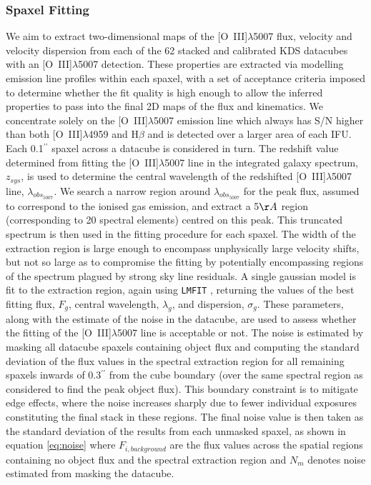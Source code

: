\documentclass[fleqn,usenatbib]{mn2e}
\begin{document}
\subsubsection{Spaxel Fitting}\label{subsubsection:spaxel_fitting}
We aim to extract two-dimensional maps of the [O~{\sc III}]$\lambda$5007 flux, velocity and velocity dispersion from each of the 62 stacked and calibrated KDS datacubes with an [O~{\sc III}]$\lambda$5007 detection.
These properties are extracted via modelling emission line profiles within each spaxel, with a set of acceptance criteria imposed to determine whether the fit quality is high enough to allow the inferred properties to pass into the final 2D maps of the flux and kinematics.
We concentrate solely on the [O~{\sc III}]$\lambda$5007 emission line which always has S/N higher than both [O~{\sc III}]$\lambda$4959 and H$\beta$ and is detected over a larger area of each IFU. \\

Each 0.1$^{\prime\prime}$ spaxel across a datacube is considered in turn.
The redshift value determined from fitting the [O~{\sc III}]$\lambda$5007 line in the integrated galaxy spectrum, $z_{sys}$, is used to determine the central wavelength of the redshifted [O~{\sc III}]$\lambda$5007 line, $\lambda_{obs_{5007}}$. 
We search a narrow region around $\lambda_{obs_{5007}}$ for the peak flux, assumed to correspond to the ionised gas emission, and extract a 5$\AA$ region (corresponding to 20 spectral elements) centred on this peak.
This truncated spectrum is then used in the fitting procedure for each spaxel.
The width of the extraction region is large enough to encompass unphysically large velocity shifts, but not so large as to compromise the fitting by potentially encompassing regions of the spectrum plagued by strong sky line residuals.
A single gaussian model is fit to the extraction region, again using {\tt LMFIT} \citep{Newville2014}, returning the values of the best fitting flux, $F_{g}$, central wavelength, $\lambda_{g}$, and dispersion, $\sigma_{g}$.
These parameters, along with the estimate of the noise in the datacube, are used to assess whether the fitting of the [O~{\sc III}]$\lambda$5007 line is acceptable or not. 
The noise is estimated by masking all datacube spaxels containing object flux and computing the standard deviation of the flux values in the spectral extraction region for all remaining spaxels inwards of 0.3$^{\prime\prime}$ from the cube boundary (over the same spectral region as considered to find the peak object flux).
This boundary constraint is to mitigate edge effects, where the noise increases sharply due to fewer individual exposures constituting the final stack in these regions.
The final noise value is then taken as the standard deviation of the results from each unmasked spaxel, as shown in equation \ref{eq:noise} where $F_{i,background}$ are the flux values across the spatial regions containing no object flux and the spectral extraction region and $N_{m}$ denotes noise estimated from masking the datacube.
\end{document}
